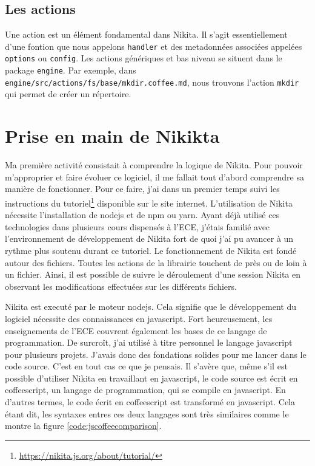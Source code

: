 \documentclass[12pt, french]{report}
\begin{document}
\subsection{Les actions}

Une action est un élément fondamental dans Nikita. Il s'agit essentiellement d'une fontion que nous appelons \texttt{handler} et des metadonnées associées appelées \texttt{options} ou \texttt{config}. Les actions génériques et bas niveau se situent dans le package \texttt{engine}. Par exemple, dans \texttt{engine/src/actions/fs/base/mkdir.coffee.md}, nous trouvons l'action \texttt{mkdir} qui permet de créer un répertoire.

\section{Prise en main de Nikikta}

Ma première activité consistait à comprendre la logique de Nikita. Pour pouvoir m'approprier et faire évoluer ce logiciel, il me fallait tout d'abord comprendre sa manière de fonctionner. Pour ce faire, j'ai dans un premier temps suivi les instructions du tutoriel\footnote{\href{https://nikita.js.org/about/tutorial/}{https://nikita.js.org/about/tutorial/}} disponible sur le site internet. L'utilisation de Nikita nécessite l'installation de \gls{nodejs} et de \gls{npm} ou \gls{yarn}. Ayant déjà utilisé ces technologies dans plusieurs cours dispensés à l'ECE, j'étais familié avec l'environnement de développement de Nikita fort de quoi j'ai pu avancer à un rythme plus soutenu durant ce tutoriel. Le fonctionnement de Nikita est fondé autour des fichiers. Toutes les actions de la librairie touchent de près ou de loin à un fichier. Ainsi, il est possible de suivre le déroulement d'une session Nikita en observant les modifications effectuées sur les différents fichiers.

Nikita est executé par le moteur \gls{nodejs}. Cela signifie que le développement du logiciel nécessite des connaissances en \gls{javascript}. Fort heureusement, les enseignements de l'ECE couvrent également les bases de ce langage de programmation. De surcroît, j'ai utilisé à titre personnel le langage \gls{javascript} pour plusieurs projets. J'avais donc des fondations solides pour me lancer dans le code source. C'est en tout cas ce que je pensais. Il s'avère que, même s'il est possible d'utiliser Nikita en travaillant en \gls{javascript}, le code source est écrit en \gls{coffeescript}, un langage de programmation, qui se compile en \gls{javascript}. En d'autres termes, le code écrit en \gls{coffeescript} est transformé en \gls{javascript}. Cela étant dit, les syntaxes entres ces deux langages sont très similaires comme le montre la figure \ref{code:jscoffeecomparison}.
\end{document}

